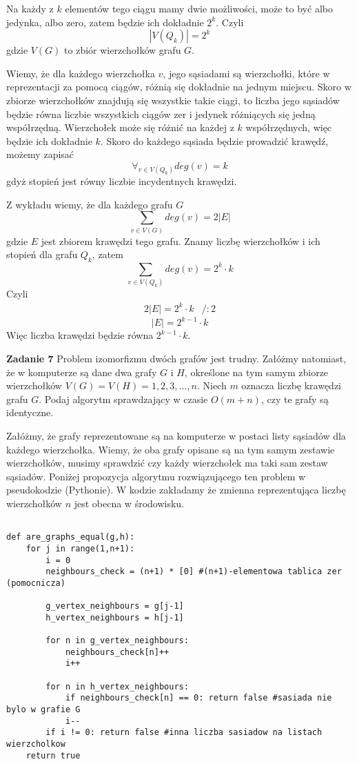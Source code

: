 \documentclass[12pt,a4paper]{article}
\begin{document}
Na każdy z \(k\) elementów tego ciągu mamy dwie możliwości, może to być albo jedynka, albo zero, zatem będzie ich dokładnie \(2^k\). Czyli
\[
	|V(Q_k)| = 2^k
\]
gdzie \(V(G)\) to zbiór wierzchołków grafu \(G\).

Wiemy, że dla każdego wierzchołka \(v\), jego sąsiadami są wierzchołki, które w reprezentacji za pomocą ciągów, różnią się dokładnie na jednym miejscu. Skoro w zbiorze wierzchołków znajdują się wszystkie takie ciągi, to liczba jego sąsiadów będzie równa liczbie wszystkich ciągów zer i jedynek różniących się jedną współrzędną. Wierzchołek może się różnić na każdej z \(k\) współrzędnych, więc będzie ich dokładnie \(k\). Skoro do każdego sąsiada będzie prowadzić krawędź, możemy zapisać
\[
	\forall_{v \in V(Q_k)} deg(v) = k
\]
gdyż stopień jest równy liczbie incydentnych krawędzi.

Z wykładu wiemy, że dla każdego grafu \( G \)
\[
	\sum_{v\in V(G)} deg(v) = 2|E|
\]
gdzie \(E\) jest zbiorem krawędzi tego grafu. Znamy liczbę wierzchołków i ich stopień dla grafu \( Q_k\), zatem
\[
	\sum_{v\in V(Q_k)} deg(v) = 2^k\cdot k 
\]
Czyli
\[
	\begin{array}{ll}
		2|E| = 2^k \cdot k & /:2
	\end{array}
\]
\[
	|E| = 2^{k-1} \cdot k
\]
Więc liczba krawędzi będzie równa \( 2^{k-1} \cdot k \).

\vskip 0.5cm
\noindent
\textbf{Zadanie 7} Problem izomorfizmu dwóch grafów jest trudny. Załóżmy natomiast, że w komputerze są dane dwa grafy \( G \) i \( H \), określone na tym samym zbiorze wierzchołków \( V(G) = V(H) = {1,2,3,...,n}\). Niech \(m\) oznacza liczbę krawędzi grafu \(G\). Podaj algorytm sprawdzający w czasie \( O(m+n) \), czy te grafy są identyczne.

Załóżmy, że grafy reprezentowane są na komputerze w postaci listy sąsiadów dla każdego wierzchołka. Wiemy, że oba grafy opisane są na tym samym zestawie wierzchołków, musimy sprawdzić czy każdy wierzchołek ma taki sam zestaw sąsiadów. Poniżej propozycja algorytmu rozwiązującego ten problem w pseudokodzie (Pythonie). W kodzie zakładamy że zmienna reprezentująca liczbę wierzchołków \(n\) jest obecna w środowisku. 


\begin{lstlisting}

def are_graphs_equal(g,h):
    for j in range(1,n+1):
        i = 0
        neighbours_check = (n+1) * [0] #(n+1)-elementowa tablica zer (pomocnicza)

        g_vertex_neighbours = g[j-1]
        h_vertex_neighbours = h[j-1]

        for n in g_vertex_neighbours:
            neighbours_check[n]++
            i++

        for n in h_vertex_neighbours:
            if neighbours_check[n] == 0: return false #sasiada nie bylo w grafie G
            i--
        if i != 0: return false #inna liczba sasiadow na listach wierzcholkow
    return true                       
\end{lstlisting}
\end{document}
